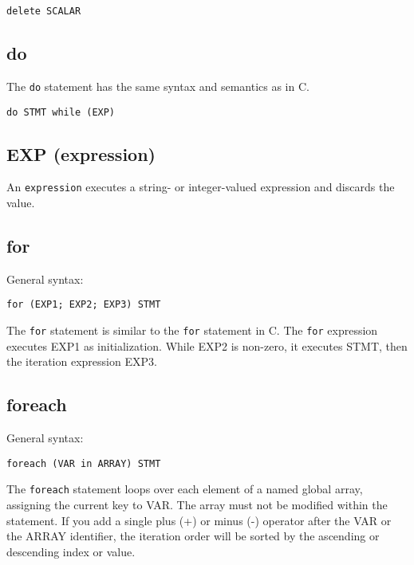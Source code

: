 \documentclass[twoside,english]{article}
\newenvironment{vindent}
{\begin{list}{}{\setlength{\listparindent}{6pt}}
\item[]}
{\end{list}}
\begin{document}
\begin{vindent}
\begin{verbatim}
delete SCALAR
\end{verbatim}
\end{vindent}

\subsection{do}
The \texttt{do} statement has the same syntax and semantics as in C.

\begin{vindent}
\begin{verbatim}
do STMT while (EXP)
\end{verbatim}
\end{vindent}

\subsection{EXP (expression)}
An \texttt{expression} executes a string- or integer-valued expression and
discards the value.


\subsection{for}
General syntax:
\begin{vindent}
\begin{verbatim}
for (EXP1; EXP2; EXP3) STMT
\end{verbatim}
\end{vindent}
The \texttt{for} statement is similar to the \texttt{for} statement in C.
The \texttt{for} expression executes EXP1 as initialization. While EXP2 is
non-zero, it executes STMT, then the iteration expression EXP3.

\subsection{foreach\label{sub:foreach}}
General syntax:
\begin{vindent}
\begin{verbatim}
foreach (VAR in ARRAY) STMT
\end{verbatim}
\end{vindent}
The \texttt{foreach} statement loops over each element of a named global array, assigning
the current key to VAR. The array must not be modified within the statement.
If you add a single plus (+) or minus (-) operator after the VAR or the ARRAY
identifier, the iteration order will be sorted by the ascending or descending
index or value. 
\end{document}
